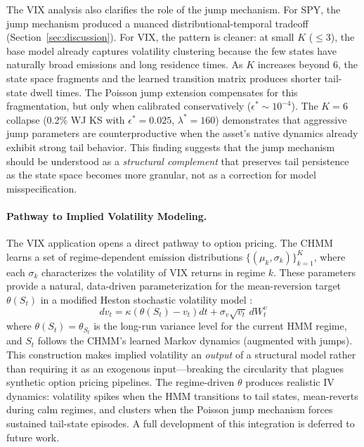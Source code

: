 The VIX analysis also clarifies the role of the jump mechanism.
For SPY, the jump mechanism produced a nuanced distributional-temporal tradeoff (Section~\ref{sec:discussion}).
For VIX, the pattern is cleaner: at small $K$ ($\leq 3$), the base model already captures volatility clustering because the few states have naturally broad emissions and long residence times.
As $K$ increases beyond 6, the state space fragments and the learned transition matrix produces shorter tail-state dwell times.
The Poisson jump extension compensates for this fragmentation, but only when calibrated conservatively ($\epsilon^* \sim 10^{-4}$).
The $K = 6$ collapse (0.2\% WJ KS with $\epsilon^* = 0.025$, $\lambda^* = 160$) demonstrates that aggressive jump parameters are counterproductive when the asset's native dynamics already exhibit strong tail behavior.
This finding suggests that the jump mechanism should be understood as a \emph{structural complement} that preserves tail persistence as the state space becomes more granular, not as a correction for model misspecification.

\paragraph{Pathway to Implied Volatility Modeling.}
The VIX application opens a direct pathway to option pricing.
The CHMM learns a set of regime-dependent emission distributions $\{(\mu_k, \sigma_k)\}_{k=1}^{K}$, where each $\sigma_k$ characterizes the volatility of VIX returns in regime $k$.
These parameters provide a natural, data-driven parameterization for the mean-reversion target $\theta(S_t)$ in a modified Heston stochastic volatility model \citep{heston1993closed}:
\begin{equation}
    dv_t = \kappa\left(\theta(S_t) - v_t\right)dt + \sigma_v \sqrt{v_t}\, dW_t^v
    \label{eq:heston_regime}
\end{equation}
where $\theta(S_t) = \theta_{S_t}$ is the long-run variance level for the current HMM regime, and $S_t$ follows the CHMM's learned Markov dynamics (augmented with jumps).
This construction makes implied volatility an \emph{output} of a structural model rather than requiring it as an exogenous input---breaking the circularity that plagues synthetic option pricing pipelines.
The regime-driven $\theta$ produces realistic IV dynamics: volatility spikes when the HMM transitions to tail states, mean-reverts during calm regimes, and clusters when the Poisson jump mechanism forces sustained tail-state episodes.
A full development of this integration is deferred to future work.

